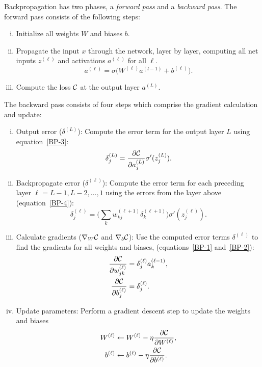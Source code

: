 Backpropagation has two phases, a {\em forward pass}  and a {\em backward pass}.
The forward pass consists of the following steps:
\begin{enumerate}[(i)]
\setlength{\itemsep}{-0.3ex}
\item Initialize all weights $W$ and biases ${b}$.\\
\item Propagate the input $x$ through the network, layer by layer, computing all net inputs ${z}^{(\ell)}$ and activations ${a}^{(\ell)}$ for all $\ell$.
    $${a}^{(\ell)} = \sigma\big(W^{(\ell)} {a}^{(l-1)} + {b}^{(\ell)}\big).$$
\item Compute the loss ${\mathcal C}$ at the output layer ${a}^{(L)}$.
\end{enumerate}
The backward pass consists of four steps which comprise the gradient calculation and update:
\begin{enumerate}[(i)]
\setlength{\itemsep}{-0.3ex}
\item Output error ($\delta^{(L)}$): Compute the error term for the output layer $L$ using equation~\eqref{BP-3}:
    $$\delta_j^{(L)} = \frac{\partial {\mathcal C}}{\partial a_j^{(L)}} \sigma'(z_j^{(L)}).$$
\item Backpropagate error ($\delta^{(\ell)}$): Compute the error term for each preceding layer $\ell=L-1, L-2, \dots, 1$ using the errors from the layer above (equation~\eqref{BP-4}):
    $$\delta_j^{(\ell)} = \Big( \sum_{k} w_{kj}^{(\ell+1)} \delta_k^{(\ell+1)} \Big) \sigma'(z_j^{(\ell)}).$$
\item Calculate gradients ($\nabla_{W} {\mathcal C}$ and $\nabla_{{b}} {\mathcal C}$): Use the computed error terms $\delta^{(\ell)}$ to find the gradients for all weights and biases, (equations~\eqref{BP-1} and~\eqref{BP-2}):
\begin{align*}
    \frac{\partial {\mathcal C}}{\partial w_{jk}^{(\ell)}} & = \delta_j^{(\ell)} a_k^{(\ell-1)}, \\
    \frac{\partial {\mathcal C}}{\partial b_j^{(\ell)}} & = \delta_j^{(\ell)}.
\end{align*}
\item Update parameters: Perform a gradient descent step to update the weights and biases
\begin{align*}
    W^{(\ell)} & \leftarrow W^{(\ell)} - \eta \frac{\partial {\mathcal C}}{\partial W^{(\ell)}}, \\
    {b}^{(\ell)} & \leftarrow {b}^{(\ell)} - \eta \frac{\partial {\mathcal C}}{\partial {b}^{(\ell)}}.
\end{align*}
\end{enumerate}








